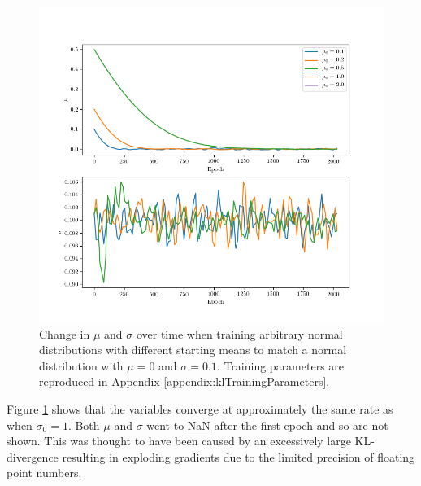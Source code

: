 \documentclass[../../main.tex]{subfiles}
\begin{document}
\begin{figure}[H]
    \begin{center}
    \includegraphics[width=\textwidth]{narrowKLDivergence}
    \caption[$\mu$ and $\sigma$ minimising $D_\text{KL}$ on dissimilar distributions]{
        Change in $\mu$ and $\sigma$ over time when training arbitrary normal distributions with different starting means to match a normal distribution with $\mu=0$ and $\sigma=0.1$. 
        Training parameters are reproduced in Appendix \ref{appendix:klTrainingParameters}.
    }
    \label{fig:narrowKLDivergence}
    \end{center}
\end{figure}
Figure \ref{fig:narrowKLDivergence} shows that the variables converge at approximately the same rate as when $\sigma_0=1$.
Both $\mu$ and $\sigma$ went to \url{NaN} after the first epoch and so are not shown.
This was thought to have been caused by an excessively large KL-divergence resulting in exploding gradients due to the limited precision of floating point numbers.
\end{document}
